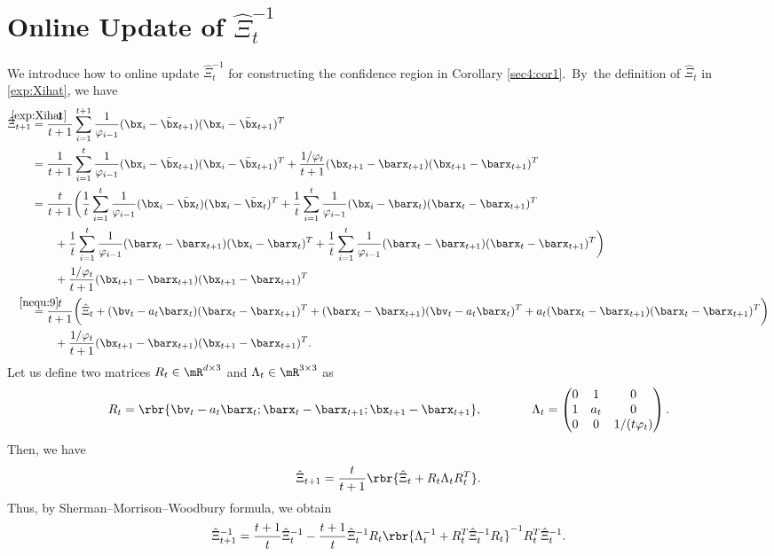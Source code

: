 
\section{Online Update of $\hat{\Xi}_t^{-1}$}\label{appendix:1}

We introduce how to online update $\hat{\Xi}_t^{-1}$ for constructing the confidence region in Corollary \ref{sec4:cor1}.~By~the definition of $\hat{\Xi}_t$ in \eqref{exp:Xihat}, we have
\begin{align*}
\hat{\Xi}_{t+1} & \stackrel{\mathclap{\eqref{exp:Xihat}}}{=} \frac{1}{t+1}\sum_{i=1}^{t+1}\frac{1}{\varphi_{i-1}}(\bx_i-\bar{\bx}_{t+1})(\bx_i-\bar{\bx}_{t+1})^T\\
& = \frac{1}{t+1}\sum_{i=1}^{t}\frac{1}{\varphi_{i-1}}(\bx_i-\bar{\bx}_{t+1})(\bx_i-\bar{\bx}_{t+1})^T + \frac{1/\varphi_t}{t+1}(\bx_{t+1}-\barx_{t+1})(\bx_{t+1}-\barx_{t+1})^T\\
& = \frac{t}{t+1}\bigg(\frac{1}{t}\sum_{i=1}^{t}\frac{1}{\varphi_{i-1}}(\bx_i-\bar{\bx}_{t})(\bx_i-\bar{\bx}_{t})^T + \frac{1}{t}\sum_{i=1}^{t}\frac{1}{\varphi_{i-1}}(\bx_i - \barx_{t})(\barx_{t} - \barx_{t+1})^T \\
&\quad\quad + \frac{1}{t}\sum_{i=1}^{t}\frac{1}{\varphi_{i-1}}(\barx_{t} - \barx_{t+1})(\bx_i - \barx_{t})^T + \frac{1}{t}\sum_{i=1}^{t}\frac{1}{\varphi_{i-1}}(\barx_{t} - \barx_{t+1})(\barx_{t} - \barx_{t+1})^T \bigg)\\
& \quad\quad + \frac{1/\varphi_{t}}{t+1}(\bx_{t+1}-\barx_{t+1})(\bx_{t+1}-\barx_{t+1})^T\\
& \stackrel{\mathclap{\eqref{nequ:9}}}{=} \frac{t}{t+1}\bigg(\hat{\Xi}_{t} + (\bv_{t} - a_{t}\barx_{t})(\barx_{t} - \barx_{t+1})^T + (\barx_{t} - \barx_{t+1})(\bv_{t} - a_{t}\barx_{t})^T + a_{t}(\barx_{t} - \barx_{t+1})(\barx_{t} - \barx_{t+1})^T\bigg) \\
&\quad\quad + \frac{1/\varphi_{t}}{t+1}(\bx_{t+1}-\barx_{t+1})(\bx_{t+1}-\barx_{t+1})^T.
\end{align*}
Let us define two matrices $R_t\in \mR^{d\times 3}$ and $\Lambda_t\in \mR^{3\times 3}$ as
\begin{equation*}
R_t = \rbr{\bv_t - a_t\barx_t; \barx_t - \barx_{t+1}; \bx_{t+1} - \barx_{t+1}}, \quad\quad\quad\quad \Lambda_t = \begin{pmatrix}
0 & 1 & 0\\
1 & a_t & 0\\
0 & 0 & 1/(t\varphi_{t})
\end{pmatrix}.
\end{equation*}
Then, we have
\begin{equation*}
\hat{\Xi}_{t+1} = \frac{t}{t+1}\rbr{\hat{\Xi}_{t} + R_t\Lambda_t R_t^T}. 
\end{equation*}
Thus, by Sherman–Morrison–Woodbury formula, we obtain
\begin{equation*}
\hat{\Xi}_{t+1}^{-1} = \frac{t+1}{t}\hat{\Xi}_{t}^{-1} - \frac{t+1}{t}\hat{\Xi}_{t}^{-1} R_t\rbr{\Lambda_t^{-1} + R_t^T\hat{\Xi}_{t}^{-1}R_t}^{-1} R_t^T\hat{\Xi}_{t}^{-1}.
\end{equation*}



